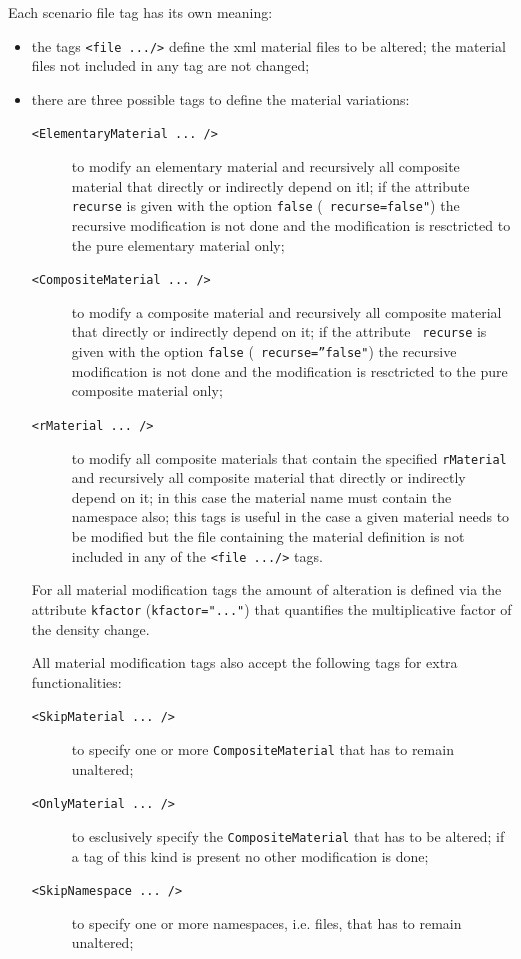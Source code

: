 \documentclass{cmspaper}
\begin{document}
Each scenario file tag has its own meaning:
\begin{itemize}
\item the tags {\tt <file .../>} define the xml material files to be
  altered; the material files not included in any tag are not changed;
\item there are three possible tags to define the material variations:
\begin{description}
  \item[{\tt <ElementaryMaterial ... />}] to modify an elementary
    material and recursively all composite material that directly or
    indirectly depend on itl; if the attribute {\tt
      recurse} is given with the option {\tt false} ({\tt
      recurse=false"}) the recursive modification is not done and the
    modification is resctricted to the pure elementary material only;
  \item[{\tt <CompositeMaterial ... />}] to modify a composite
    material and recursively all composite material that directly or 
    indirectly depend on it; if the attribute {\tt
      recurse} is given with the option {\tt false} ({\tt
      recurse=''false"}) the recursive modification is not done and the
    modification is resctricted to the pure composite material only;
  \item[{\tt <rMaterial ... />}] to modify all composite materials
    that contain the specified {\tt rMaterial} and recursively all composite material that directly or 
    indirectly depend on it; in this case the material name must
    contain the namespace also; this tags is useful in the case a
    given material needs to be modified but the file containing the
    material definition is not included in any of the {\tt <file
      .../>} tags. 
\end{description}
For all material modification tags the amount of alteration is
defined via the attribute {\tt kfactor} ({\tt kfactor="..."}) that quantifies the
multiplicative factor of the density change.

All material modification tags also accept the following tags for
extra functionalities:
\begin{description}
  \item[{\tt <SkipMaterial ... />}] to specify one or more {\tt CompositeMaterial} 
  that has to remain unaltered;
\item[{\tt <OnlyMaterial ... />}] to esclusively specify the {\tt CompositeMaterial} 
  that has to be altered; if a tag of this kind is present
  no other modification is done;
\item[{\tt <SkipNamespace ... />}] to specify one or more namespaces,
  i.e. files, that has to remain unaltered;
\end{description}
\end{itemize}
\end{document}
